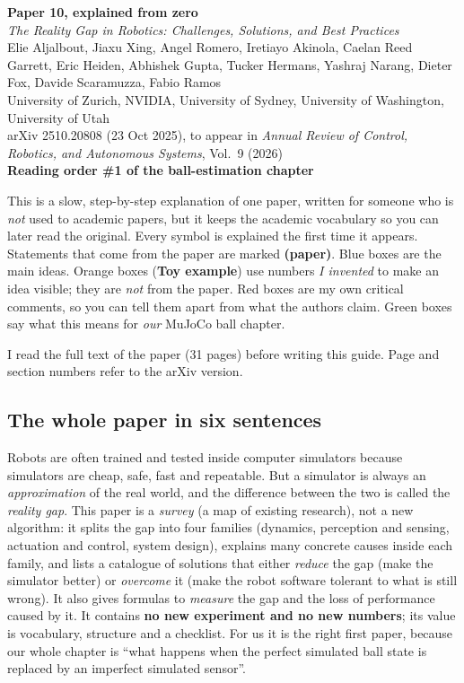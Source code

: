 \documentclass[11pt,a4paper]{article}
\begin{document}
\setcounter{tocdepth}{1}

\begin{center}
{\LARGE\bfseries\color{cblue} Paper 10, explained from zero}\\[0.6em]
{\large \textit{The Reality Gap in Robotics: Challenges, Solutions, and Best Practices}}\\[0.5em]
Elie Aljalbout, Jiaxu Xing, Angel Romero, Iretiayo Akinola, Caelan Reed Garrett, Eric Heiden,
Abhishek Gupta, Tucker Hermans, Yashraj Narang, Dieter Fox, Davide Scaramuzza, Fabio Ramos\\
University of Zurich, NVIDIA, University of Sydney, University of Washington, University of Utah\\
arXiv 2510.20808 (23 Oct 2025), to appear in \emph{Annual Review of Control, Robotics, and
Autonomous Systems}, Vol.~9 (2026)\\[0.4em]
\textbf{Reading order \#1 of the ball-estimation chapter}
\end{center}

\begin{idea}
This is a slow, step-by-step explanation of one paper, written for someone who is \emph{not}
used to academic papers, but it keeps the academic vocabulary so you can later read the
original. Every symbol is explained the first time it appears. Statements that come from the
paper are marked \textbf{(paper)}. Blue boxes are the main ideas. Orange boxes
(\textbf{Toy example}) use numbers \emph{I invented} to make an idea visible; they are
\emph{not} from the paper. Red boxes are my own critical comments, so you can tell them apart
from what the authors claim. Green boxes say what this means for \emph{our} MuJoCo ball
chapter.

I read the full text of the paper (31 pages) before writing this guide. Page and section
numbers refer to the arXiv version.
\end{idea}

\subsection*{The whole paper in six sentences}
Robots are often trained and tested inside computer simulators because simulators are cheap,
safe, fast and repeatable. But a simulator is always an \emph{approximation} of the real world,
and the difference between the two is called the \emph{reality gap}. This paper is a
\emph{survey} (a map of existing research), not a new algorithm: it splits the gap into four
families (dynamics, perception and sensing, actuation and control, system design), explains
many concrete causes inside each family, and lists a catalogue of solutions that either
\emph{reduce} the gap (make the simulator better) or \emph{overcome} it (make the robot
software tolerant to what is still wrong). It also gives formulas to \emph{measure} the gap and
the loss of performance caused by it. It contains \textbf{no new experiment and no new
numbers}; its value is vocabulary, structure and a checklist. For us it is the right first
paper, because our whole chapter is ``what happens when the perfect simulated ball state is
replaced by an imperfect simulated sensor''.
\end{document}
